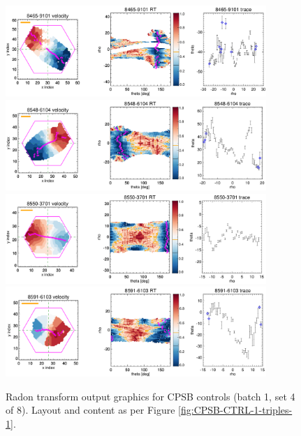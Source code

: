 \documentclass[fleqn,usenatbib]{mnras}
\begin{document}
\begin{figure}
    \centering
    \includegraphics[width=0.88\textwidth]{Images/SN1-MC250/CPSB-CTRL-1-triples/8465-9101-1-250-10.png}
    \includegraphics[width=0.88\textwidth]{Images/SN1-MC250/CPSB-CTRL-1-triples/8548-6104-1-250-10.png}
    \includegraphics[width=0.88\textwidth]{Images/SN1-MC250/CPSB-CTRL-1-triples/8550-3701-1-250-10.png}
    \includegraphics[width=0.88\textwidth]{Images/SN1-MC250/CPSB-CTRL-1-triples/8591-6103-1-250-10.png}    
    \caption{Radon transform output graphics for CPSB controls (batch 1, set 4 of 8). Layout and content as per Figure \ref{fig:CPSB-CTRL-1-triples-1}.}
    \label{fig:CPSB-CTRL-1-triples-4}
\end{figure}
\end{document}
